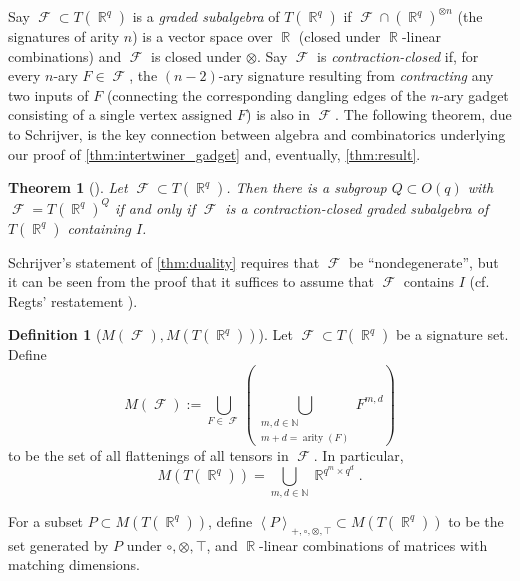 \documentclass{article}
\newtheorem{theorem}{Theorem}[section]
\theoremstyle{remark}
\theoremstyle{definition}
\newtheorem{definition}{Definition}[section]
\DeclareMathOperator{\rr}{\mathbb{R}}
\DeclareMathOperator{\arity}{arity}
\DeclareMathOperator{\fc}{\mathcal{F}}
\newcommand{\tcwd}[1]{\left\langle #1 \right\rangle_{+, \circ, \otimes ,\top}}
\begin{document}
Say $\fc \subset T(\rr^q)$ is a \emph{graded subalgebra} of $T(\rr^q)$ if 
$\fc \cap (\rr^q)^{\otimes n}$ (the signatures of arity $n$) 
is a vector space over $\rr$ (closed under $\rr$-linear combinations) and
$\fc$ is closed under $\otimes$.
Say $\fc$ is \emph{contraction-closed} if, for every $n$-ary $F \in \fc$,
the $(n-2)$-ary signature resulting from \emph{contracting} any two inputs of $F$ 
(connecting the corresponding dangling edges of the $n$-ary gadget consisting of a single vertex
assigned $F$) is also in $\fc$.
The following theorem, due to Schrijver, is the key connection between
algebra and combinatorics underlying
our proof of \autoref{thm:intertwiner_gadget} and, eventually, \autoref{thm:result}.
\begin{theorem}[{\cite[{Corollary 1e}]{schrijver_tensor_2008}}]
    Let $\fc \subset T(\rr^q)$. Then there is a subgroup $Q \subset O(q)$ with $\fc = T(\rr^q)^Q$
    if and only if $\fc$ is a contraction-closed graded subalgebra of $T(\rr^q)$ containing $I$.
    \label{thm:duality}
\end{theorem}
Schrijver's statement of \autoref{thm:duality} requires that
$\fc$ be ``nondegenerate'', but it can be seen from the proof that
it suffices to assume that $\fc$ contains $I$ (cf. Regts' restatement
\cite[Theorem 4]{regts_rank_2012}).

\begin{definition}[$M(\fc),M(T(\rr^q))$]
    Let $\fc \subset T(\rr^q)$ be a signature set. Define 
    \[
        M(\fc) := \bigcup_{F \in \fc}\left(\bigcup_{\substack{m,d \in \mathbb{N} \\ m+d=\arity(F)}} 
        F^{m,d}\right)
    \]
    to be the set of all flattenings of all tensors in $\fc$. In particular,
    \[
        M(T(\rr^q)) = \bigcup_{m,d \in \mathbb{N}} \rr^{q^m\times q^d}.
    \]
\end{definition}
For a subset $P \subset M(T(\rr^q))$, define $\tcwd{P} \subset M(T(\rr^q))$ to be the set generated
by $P$ under $\circ, \otimes, \top$, and $\rr$-linear combinations of matrices with matching
dimensions.
\end{document}
